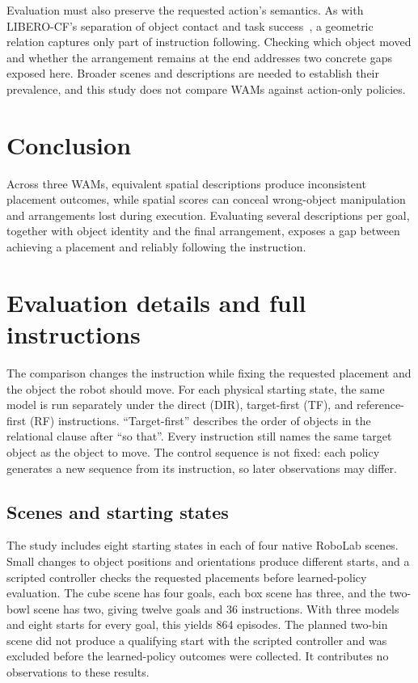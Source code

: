 \documentclass{article}
\begin{document}
Evaluation must also preserve the requested action's semantics. As with LIBERO-CF's separation of object contact and task success~\citep{fang2026counterfactual}, a geometric relation captures only part of instruction following. Checking which object moved and whether the arrangement remains at the end addresses two concrete gaps exposed here. Broader scenes and descriptions are needed to establish their prevalence, and this study does not compare WAMs against action-only policies.

\section{Conclusion}
Across three WAMs, equivalent spatial descriptions produce inconsistent placement outcomes, while spatial scores can conceal wrong-object manipulation and arrangements lost during execution. Evaluating several descriptions per goal, together with object identity and the final arrangement, exposes a gap between achieving a placement and reliably following the instruction.

\clearpage

\clearpage
\appendix

\setlength{\parskip}{5.5pt}
\section{Evaluation details and full instructions}
\label{app:tasks}
The comparison changes the instruction while fixing the requested placement and the object the robot should move. For each physical starting state, the same model is run separately under the direct (DIR), target-first (TF), and reference-first (RF) instructions. ``Target-first'' describes the order of objects in the relational clause after ``so that''. Every instruction still names the same target object as the object to move. The control sequence is not fixed: each policy generates a new sequence from its instruction, so later observations may differ.

\subsection{Scenes and starting states}
The study includes eight starting states in each of four native RoboLab scenes. Small changes to object positions and orientations produce different starts, and a scripted controller checks the requested placements before learned-policy evaluation. The cube scene has four goals, each box scene has three, and the two-bowl scene has two, giving twelve goals and 36 instructions. With three models and eight starts for every goal, this yields 864 episodes. The planned two-bin scene did not produce a qualifying start with the scripted controller and was excluded before the learned-policy outcomes were collected. It contributes no observations to these results.
\end{document}
